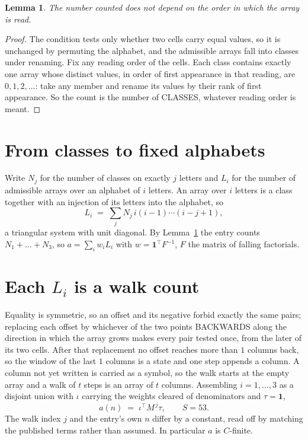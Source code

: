 \documentclass[11pt,a4paper]{article}
\theoremstyle{plain}
\newtheorem{lemma}[theorem]{Lemma}
\theoremstyle{definition}
\begin{document}
\begin{lemma}\label{lem:order}
The number counted does not depend on the order in which the array is read.
\end{lemma}

\begin{proof}
The condition tests only whether two cells carry equal values, so it is unchanged by permuting
the alphabet, and the admissible arrays fall into classes under renaming. Fix any reading order
of the cells. Each class contains exactly one array whose distinct values, in order of first
appearance in that reading, are $0,1,2,\dots$: take any member and rename its values by their
rank of first appearance. So the count is the number of CLASSES, whatever reading order is
meant.
\end{proof}

\section{From classes to fixed alphabets}

Write $N_j$ for the number of classes on exactly $j$ letters and $L_i$ for the number of
admissible arrays over an alphabet of $i$ letters. An array over $i$ letters is a class together
with an injection of its letters into the alphabet, so
\[
L_i\;=\;\sum_j N_j\,i(i-1)\cdots(i-j+1),
\]
a triangular system with unit diagonal. By Lemma~\ref{lem:order} the entry counts
$N_1+\dots+N_{3}$, so $a=\sum_i w_iL_i$ with $w=\mathbf{1}^{\!\top}F^{-1}$, $F$ the
matrix of falling factorials.

\section{Each $L_i$ is a walk count}

Equality is symmetric, so an offset and its negative forbid exactly the same pairs; replacing
each offset by whichever of the two points BACKWARDS along the direction in which the array
grows makes every pair tested once, from the later of its two cells. After that replacement no
offset reaches more than $1$ columns back, so the window of the last $1$
columns is a state and one step appends a column. A column not yet written is
carried as a symbol, so the walk starts at the empty array and a walk of $t$ steps is an array
of $t$ columns. Assembling $i=1,\dots,3$ as a disjoint union with $\iota$ carrying the
weights cleared of denominators and $\tau=\mathbf{1}$,
\[
a(n)\;=\;\iota^{\!\top}M^{\,j}\tau ,\qquad S=53.
\]
The walk index $j$ and the entry's own $n$ differ by a constant, read off by matching the
published terms rather than assumed. In particular $a$ is $C$-finite.
\end{document}
